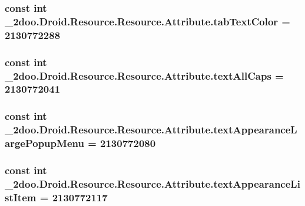 \hypertarget{class__2doo_1_1_droid_1_1_resource_1_1_attribute_2eb5ad0120f58051ab8c55a6b4e6a060}{
\subsubsection[{tabTextColor}]{\setlength{\rightskip}{0pt plus 5cm}const int \_\-2doo.Droid.Resource.Resource.Attribute.tabTextColor = 2130772288}}
\label{class__2doo_1_1_droid_1_1_resource_1_1_attribute_2eb5ad0120f58051ab8c55a6b4e6a060}


\hypertarget{class__2doo_1_1_droid_1_1_resource_1_1_attribute_e1bee6c9b1ebf43d6c5d3bcfd7dd7728}{
\subsubsection[{textAllCaps}]{\setlength{\rightskip}{0pt plus 5cm}const int \_\-2doo.Droid.Resource.Resource.Attribute.textAllCaps = 2130772041}}
\label{class__2doo_1_1_droid_1_1_resource_1_1_attribute_e1bee6c9b1ebf43d6c5d3bcfd7dd7728}


\hypertarget{class__2doo_1_1_droid_1_1_resource_1_1_attribute_af2095993dcce62596fb6f3c269ebb80}{
\subsubsection[{textAppearanceLargePopupMenu}]{\setlength{\rightskip}{0pt plus 5cm}const int \_\-2doo.Droid.Resource.Resource.Attribute.textAppearanceLargePopupMenu = 2130772080}}
\label{class__2doo_1_1_droid_1_1_resource_1_1_attribute_af2095993dcce62596fb6f3c269ebb80}


\hypertarget{class__2doo_1_1_droid_1_1_resource_1_1_attribute_396e1a42443df2f61589223d74b7c4c0}{
\subsubsection[{textAppearanceListItem}]{\setlength{\rightskip}{0pt plus 5cm}const int \_\-2doo.Droid.Resource.Resource.Attribute.textAppearanceListItem = 2130772117}}
\label{class__2doo_1_1_droid_1_1_resource_1_1_attribute_396e1a42443df2f61589223d74b7c4c0}



